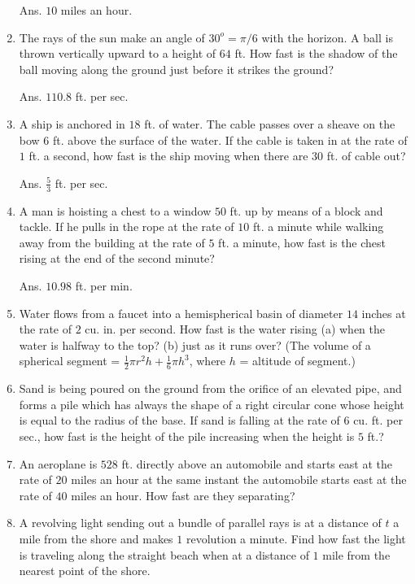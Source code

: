 \begin{enumerate}
Ans. $10$ miles an hour.

\item
The rays of the sun make an angle of $30^o = \pi/6$ with the 
horizon. A ball is thrown vertically upward to a height 
of $64$ ft. How fast is the shadow of the ball moving along 
the ground just before it strikes the ground? 

Ans. $110.8$ ft. per sec.

\item
A ship is anchored in $18$ ft. of water. The cable passes over 
a sheave on the bow $6$ ft. above the surface of the water. If 
the cable is taken in at the rate of $1$ ft. a second, how fast 
is the ship moving when there are $30$ ft. of cable out? 

Ans. $\frac{5}{3}$ ft. per sec.

\item
A man is hoisting a chest to a window $50$ ft. up by means of 
a block and tackle. If he pulls in the rope at the rate of $10$ ft. 
a minute while walking away from the building at the rate of 
$5$ ft. a minute, how fast is the chest rising at the end of the 
second minute? 

Ans. $10.98$ ft. per min.

\item
Water flows from a faucet into a hemispherical basin of 
diameter $14$ inches at the rate of $2$ cu. in. per second. 
How fast is the water rising (a) when the water is halfway to 
the top? (b) just as it runs over? (The volume of a 
spherical segment = $\frac{1}{2} \pi r^2 h + \frac{1}{6} \pi h^3$, 
where $h$ = altitude of segment.)

\item
Sand is being poured on the ground from the orifice of an 
elevated pipe, and forms a pile which has always the shape of a 
right circular cone whose height is equal to the radius of the 
base. If sand is falling at the rate of $6$ cu. ft. per sec., 
how fast is the height of the pile increasing when the height is $5$ ft.?

\item
An aeroplane is $528$ ft. directly above an automobile and starts 
east at the rate of $20$ miles an hour at the same instant the 
automobile starts east at the rate of $40$ miles an hour. 
How fast are they separating?

\item
A revolving light sending out a bundle of parallel rays is at 
a distance of $t$ a mile from the shore and makes $1$ revolution a 
minute. Find how fast the light is traveling along the straight 
beach when at a distance of $1$ mile from the nearest point of 
the shore. 


\end{enumerate}
